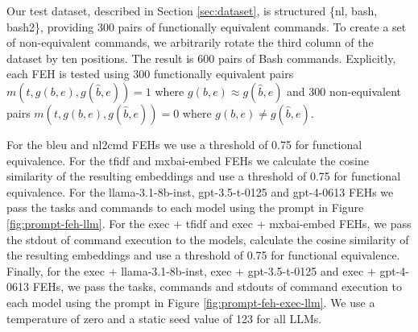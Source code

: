 \documentclass[11pt]{article}
\begin{document}
Our test dataset, described in Section \ref{sec:dataset}, is structured \{nl, bash, bash2\}, providing 300 pairs of functionally equivalent commands. To create a set of non-equivalent commands, we arbitrarily rotate the third column of the dataset by ten positions. The result is 600 pairs of Bash commands. Explicitly, each FEH is tested using 300 functionally equivalent pairs $m(t, g(b,e), g(\hat{b},e))=1$ where $g(b, e) \approx g(\hat{b}, e)$ and 300 non-equivalent pairs $m(t, g(b,e), g(\hat{b},e))=0$ where $g(b, e) \neq g(\hat{b}, e)$.

For the bleu and nl2cmd FEHs we use a threshold of 0.75 for functional equivalence. For the tfidf and mxbai-embed FEHs we calculate the cosine similarity of the resulting embeddings and use a threshold of 0.75 for functional equivalence. For the llama-3.1-8b-inst, gpt-3.5-t-0125 and gpt-4-0613 FEHs we pass the tasks and commands to each model using the prompt in Figure \ref{fig:prompt-feh-llm}. For the exec + tfidf and exec + mxbai-embed FEHs, we pass the stdout of command execution to the models, calculate the cosine similarity of the resulting embeddings and use a threshold of 0.75 for functional equivalence. Finally, for the exec + llama-3.1-8b-inst, exec + gpt-3.5-t-0125 and exec + gpt-4-0613 FEHs, we pass the tasks, commands and stdouts of command execution to each model using the prompt in Figure \ref{fig:prompt-feh-exec-llm}. We use a temperature of zero and a static seed value of 123 for all LLMs.
\end{document}
